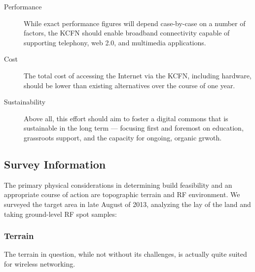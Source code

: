 \begin{description}
\item[Performance] While exact performance figures will depend case-by-case on a
number of factors, the KCFN should enable broadband connectivity capable of supporting
telephony, web 2.0, and multimedia applications.

\item[Cost] The total cost of
accessing the Internet via the KCFN, including hardware, should be lower than existing
alternatives over the course of one year.

\item[Sustainability] Above all, this effort should aim to foster a digital commons 
that is sustainable in the long term --- focusing first and foremost on education, grassroots
support, and the capacity for ongoing, organic grwoth.
\end{description}


\subsection{Survey Information}
The primary physical considerations in determining build feasibility and an
appropriate course of action are topographic terrain and RF environment. We
surveyed the target area in late August of 2013, analyzing the lay of the land
and taking ground-level RF spot samples: \par
\subsubsection{Terrain}
The terrain in question, while not without its challenges, is actually quite
suited for  wireless networking. \par
\begin{center}
\end{center}

